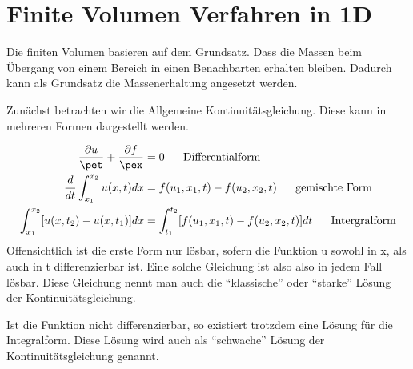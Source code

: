 \section{Finite Volumen Verfahren in 1D}
Die finiten Volumen basieren auf dem Grundsatz. Dass die Massen beim \"Ubergang von einem Bereich in einen Benachbarten erhalten bleiben. Dadurch kann als Grundsatz die Massenerhaltung angesetzt werden. 
\par
Zun\"achst betrachten wir die Allgemeine Kontinuit\"atsgleichung. Diese kann in mehreren Formen dargestellt werden. 
\par
\begin{align*}
	\frac{\partial u}{\pet} + \frac{\partial f}{\pex} &= 0~~~~~\textrm{Differentialform} \\
	\frac{d}{dt}\int_{x_1}^{x_2} u(x,t)dx &= f(u_1,x_1,t) - f(u_2,x_2,t)~~~~~\textrm{gemischte Form} \\
	\int_{x_1}^{x_2}[u(x,t_2) - u(x,t_1)]dx &= \int_{t_1}^{t_2}[f(u_1,x_1,t) - f(u_2,x_2,t)]dt~~~~~\textrm{Intergralform}
\end{align*}
Offensichtlich ist die erste Form nur l\"osbar, sofern die Funktion u sowohl in x, als auch in t differenzierbar ist. Eine solche Gleichung ist also also in jedem Fall l\"osbar. Diese Gleichung nennt man auch die ``klassische'' oder ``starke'' L\"osung der Kontinuit\"atsgleichung. 
\par
Ist die Funktion nicht differenzierbar, so existiert trotzdem eine L\"osung f\"ur die Integralform. Diese L\"osung wird auch als ``schwache'' L\"osung der Kontinuit\"atsgleichung genannt.

